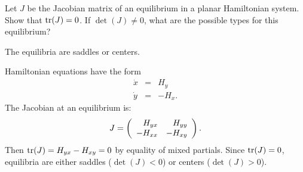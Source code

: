 \documentclass{ximera}
\begin{document}
\begin{exercise} \label{c14.7.8}
Let $J$ be the Jacobian matrix of an equilibrium in a planar Hamiltonian 
system. Show that ${\rm tr}(J)=0$.  If $\det(J)\neq 0$, what are the possible
types for this equilibrium?

\begin{solution}
\ans The equilibria are saddles or centers.

\soln  Hamiltonian equations have the form 
\begin{eqnarray*}
\dot{x} & = & H_y \\
\dot{y} & = & -H_x.
\end{eqnarray*}
The Jacobian at an equilibrium is:
\[
J = \left(\begin{array}{rr} H_{yx} & H_{yy}\\ -H_{xx} &-H_{xy}\end{array}\right).
\]
Then ${\rm tr}(J)=H_{yx}-H_{xy}=0$ by equality of mixed partials.  Since 
${\rm tr}(J)=0$, equilibria are either saddles ($\det(J)<0$) or centers
($\det(J)>0$).



\end{solution}
\end{exercise}
\end{document}
